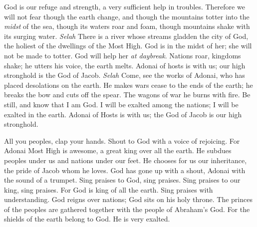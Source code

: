 \begin{biblechapter} %
 God is our refuge and strength, 
a very sufficient help in troubles.
\verse Therefore we will not fear though the earth change, 
and though the mountains totter into the \textit{midst} of the sea,
\verse though its waters roar and foam, 
though mountains shake with its surging water. \textit{Selah}
\verse There is a river whose streams gladden the city of God, 
the holiest of the dwellings of the Most High.
\verse God is in the midst of her; 
she will not be made to totter. 
God will help her \textit{at daybreak}.
\verse Nations roar, kingdoms shake; 
he utters his voice, the earth melts.
\verse Adonai of hosts is with us; 
our high stronghold is the God of Jacob. \textit{Selah}
\verse Come, see the works of Adonai, 
who has placed desolations on the earth.
\verse He makes wars cease to the ends of the earth; 
he breaks the bow and cuts off the spear. 
The wagons of war he burns with fire.
\verse Be still, and know that I am God. 
I will be exalted among the nations; 
I will be exalted in the earth.
\verse Adonai of Hosts is with us; 
the God of Jacob is our high stronghold.
\end{biblechapter}

\begin{biblechapter} %
 All you peoples, clap your hands. 
Shout to God with a voice of rejoicing.
\verse For Adonai Most High is awesome, 
a great king over all the earth.
\verse He subdues peoples under us 
and nations under our feet.
\verse He chooses for us our inheritance, 
the pride of Jacob whom he loves.
\verse God has gone up with a shout, 
Adonai with the sound of a trumpet.
\verse Sing praises to God, sing praises. 
Sing praises to our king, sing praises.
\verse For God is king of all the earth. 
Sing praises with understanding.
\verse God reigns over nations; 
God sits on his holy throne.
\verse The princes of the peoples are gathered together 
with the people of Abraham’s God. 
For the shields of the earth belong to God. 
He is very exalted.
\end{biblechapter}

